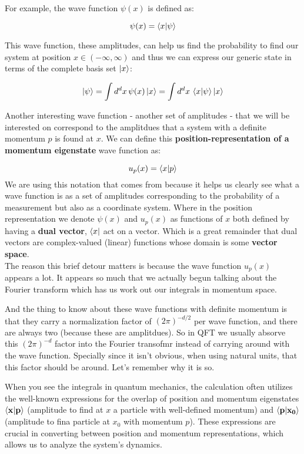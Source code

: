 For example, the wave function $\psi(x)$ is defined as:

$$
\psi(x) = \braket{x | \psi}
$$

This wave function, these amplitudes, can help us find the probability to find our system at position
$x \in \left( -\infty , \infty\right)$ and thus we can express our generic state in terms of the
complete basis set $\ket{x}$:

$$
\ket{\psi} = \int d^d x \, \psi(x) \ket{x} = \int d^d x \, \braket{x | \psi}  \ket{x}
$$

Another interesting wave function - another set of amplitudes - that we will be interested on
correspond to the amplitdues that a system with a definite momentum $p$ is found at $x$.
We can define this \textbf{position-representation of a momentum eigenstate} wave function as:

$$
u_p (x) = \braket{x | p}
$$
We are using this notation that comes from \cite{binney} because it helps us clearly see what a wave function
is as a set of amplitudes corresponding to the probability of a measurement but also
as a coordinate system.
Where in the position representation we denote $\psi(x)$ and $u_p (x)$ as functions of $x$
both defined by having a \textbf{dual vector}, $\bra{x}$ act on a vector.
Which is a great remainder that dual vectors are complex-valued (linear) functions whose domain is some
\textbf{vector space}.
\\

The reason this brief detour matters is because the wave function $u_p (x)$ appears a lot.
It appears so much that we actually begun talking about the Fourier transform which has us work out
our integrals in momentum space.

And the thing to know about these wave functions with definite momentum is that they carry a
normalization factor of $\left(2\pi\right)^{-d/2}$ per wave function, and there are always two
(because these are amplitdues).
So in QFT we usually absorve this $\left(2\pi\right)^{-d}$ factor into the Fourier transofmr instead of
carrying around with the wave function.
Specially since it isn't obvious, when using natural units, that this factor should be around.
Let's remember why it is so.

When you see the integrals in quantum mechanics,
the calculation often utilizes the well-known expressions for the overlap of position and momentum eigenstates
$\braket{\boldsymbol{\mathbf{x}} | \boldsymbol{\mathbf{p}}}$ (amplitude to find at $x$ a particle with well-defined momentum)
and $\braket{\boldsymbol{\mathbf{p}} | \boldsymbol{\mathbf{x_0}}}$ (amplitude to fina particle at $x_0$ with momentum $p$).
These expressions are crucial in converting between position and momentum representations,
which allows us to analyze the system's dynamics.

